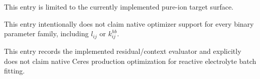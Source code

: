 \documentclass[12pt, letterpaper]{article}
\begin{document}
This entry is limited to the currently implemented pure-ion target surface.


This entry intentionally does not claim native optimizer support for every
binary parameter family, including \(l_{ij}\) or \(k^{hb}_{ij}\).


This entry records the implemented residual/context evaluator and explicitly
does not claim native Ceres production optimization for reactive electrolyte
batch fitting.
\end{document}
